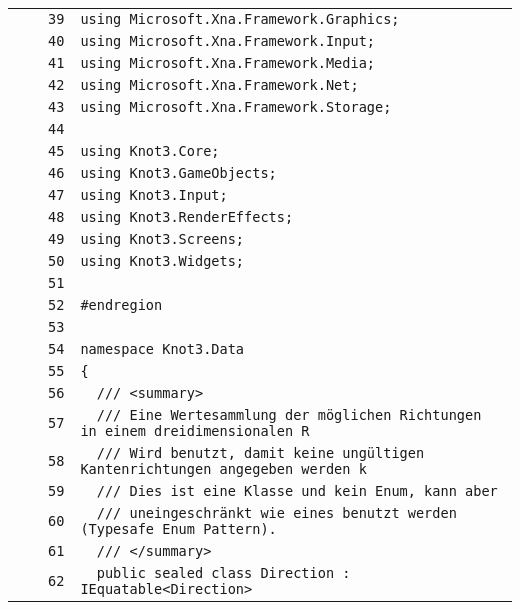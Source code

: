 \documentclass[a4paper,10pt]{article}
\begin{document}
\begin{longtable}[l]{lrrl}
\cellcolor{gray} &  & \verb~39~ & \verb~using Microsoft.Xna.Framework.Graphics;~\\
\cellcolor{gray} &  & \verb~40~ & \verb~using Microsoft.Xna.Framework.Input;~\\
\cellcolor{gray} &  & \verb~41~ & \verb~using Microsoft.Xna.Framework.Media;~\\
\cellcolor{gray} &  & \verb~42~ & \verb~using Microsoft.Xna.Framework.Net;~\\
\cellcolor{gray} &  & \verb~43~ & \verb~using Microsoft.Xna.Framework.Storage;~\\
\cellcolor{gray} &  & \verb~44~ & \verb~~\\
\cellcolor{gray} &  & \verb~45~ & \verb~using Knot3.Core;~\\
\cellcolor{gray} &  & \verb~46~ & \verb~using Knot3.GameObjects;~\\
\cellcolor{gray} &  & \verb~47~ & \verb~using Knot3.Input;~\\
\cellcolor{gray} &  & \verb~48~ & \verb~using Knot3.RenderEffects;~\\
\cellcolor{gray} &  & \verb~49~ & \verb~using Knot3.Screens;~\\
\cellcolor{gray} &  & \verb~50~ & \verb~using Knot3.Widgets;~\\
\cellcolor{gray} &  & \verb~51~ & \verb~~\\
\cellcolor{gray} &  & \verb~52~ & \verb~#endregion~\\
\cellcolor{gray} &  & \verb~53~ & \verb~~\\
\cellcolor{gray} &  & \verb~54~ & \verb~namespace Knot3.Data~\\
\cellcolor{gray} &  & \verb~55~ & \verb~{~\\
\cellcolor{gray} &  & \verb~56~ & \verb~  /// <summary>~\\
\cellcolor{gray} &  & \verb~57~ & \verb~  /// Eine Wertesammlung der möglichen Richtungen in einem dreidimensionalen R~\\
\cellcolor{gray} &  & \verb~58~ & \verb~  /// Wird benutzt, damit keine ungültigen Kantenrichtungen angegeben werden k~\\
\cellcolor{gray} &  & \verb~59~ & \verb~  /// Dies ist eine Klasse und kein Enum, kann aber~\\
\cellcolor{gray} &  & \verb~60~ & \verb~  /// uneingeschränkt wie eines benutzt werden (Typesafe Enum Pattern).~\\
\cellcolor{gray} &  & \verb~61~ & \verb~  /// </summary>~\\
\cellcolor{gray} &  & \verb~62~ & \verb~  public sealed class Direction : IEquatable<Direction>~\\

\end{longtable}
\end{document}
